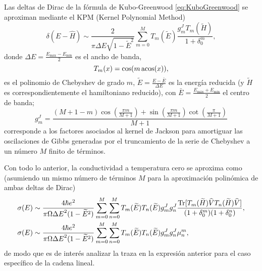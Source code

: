Las deltas de Dirac de la fórmula de Kubo-Greenwood \eqref{eq:KuboGreenwood} se aproximan mediante el KPM (Kernel Polynomial Method) \autocite{Weise2006}
\begin{equation}\label{eq:diracDeltaKPM}
	\delta(E - \widehat{H}) \sim \frac{2}{\pi \Delta E \sqrt{1 - \widetilde{E}^2}} \sum_{m=0}^{M} T_m(\widetilde{E}) \frac{g^J_m T_m(\widetilde{H})}{1 + \delta^m_0},
\end{equation}
donde 
	$\Delta E = \frac{E_{\mathrm{máx}} - E_{\mathrm{mín}}}{2}$
es el ancho de banda, 
\begin{equation}\label{eq:ChebyshevPol}
	T_m(x) = \cos(m\acos(x)),
\end{equation}
es el polinomio de Chebyshev de grado $m$,
	$\widetilde{E} = \frac{E - \bar{E}}{\Delta E}$ 
es la energía reducida (y $\widetilde{H}$ es correspondientemente el hamiltoniano reducido), con $\bar{E} = \frac{E_{\mathrm{máx}} + E_{\mathrm{mín}}}{2}$ el centro de banda;
\begin{equation}\label{eq:jacksonKernel}
	g_m^J = \frac{(M + 1 - m)\cos(\frac{\pi m}{M + 1}) + \sin(\frac{\pi m}{M + 1})\cot(\frac{\pi}{M + 1})}{M + 1}
\end{equation}
corresponde a los factores asociados al kernel de Jackson para amortiguar las oscilaciones de Gibbs generadas por el truncamiento de la serie de Chebyshev a un número $M$ finito de términos.

Con todo lo anterior, la conductividad a temperatura cero se aproxima como (asumiendo un mismo número de términos $M$ para la aproximación polinómica de ambas deltas de Dirac)
\begin{equation}\label{eq:KGapprox}
	\begin{aligned}
		\sigma(E) &\sim \frac{4\hbar e^2}{\pi\Omega{\Delta E}^2(1 - \widetilde{E}^2)} \sum_{m=0}^{M} \sum_{n=0}^{M} T_m(\widetilde{E})T_n(\widetilde{E}) g^J_m g^J_n \frac{\Trace[T_m(\widetilde{H})\widehat{V}T_n(\widetilde{H})\widehat{V}]}{(1 + \delta^m_0) (1 + \delta^n_0)}, \\ 
		\sigma(E) &\sim \frac{4\hbar e^2}{\pi\Omega{\Delta E}^2(1 - \widetilde{E}^2)} \sum_{m=0}^{M} \sum_{n=0}^{M} T_m(\widetilde{E})T_n(\widetilde{E}) g^J_m g^J_n \mu^m_n,
	\end{aligned}
\end{equation}
de modo que es de interés analizar la traza en la expresión anterior para el caso específico de la cadena lineal.

